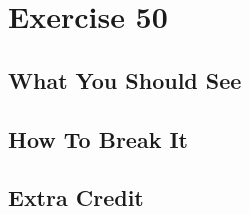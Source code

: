 \chapter{Exercise 50}


\section{What You Should See}


\section{How To Break It}


\section{Extra Credit}




